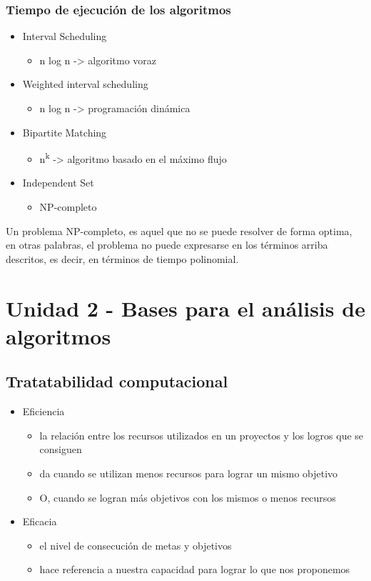 \documentclass[letterpaper]{article}
\begin{document}
\subsubsection{Tiempo de ejecución de los algoritmos}
\label{sec:org1f630ad}
\begin{itemize}
\item Interval Scheduling
\begin{itemize}
\item n log n -> algoritmo voraz
\end{itemize}
\item Weighted interval scheduling
\begin{itemize}
\item n log n -> programación dinámica
\end{itemize}
\item Bipartite Matching
\begin{itemize}
\item n\textsuperscript{k} -> algoritmo basado en el máximo flujo
\end{itemize}
\item Independent Set
\begin{itemize}
\item NP-completo
\end{itemize}
\end{itemize}

Un problema NP-completo, es aquel que no se puede resolver de forma optima, en
otras palabras, el problema no puede expresarse en los términos arriba
descritos, es decir, en términos de tiempo polinomial.
\section{Unidad 2 - Bases para el análisis de algoritmos}
\label{sec:org84d6785}
\subsection{Tratatabilidad computacional}
\label{sec:org8204d59}
\begin{itemize}
\item Eficiencia
\begin{itemize}
\item la relación entre los recursos utilizados en un proyectos y los logros que
se consiguen
\item da cuando se utilizan menos recursos para lograr un mismo objetivo
\item O, cuando se logran más objetivos con los mismos o menos recursos
\end{itemize}
\item Eficacia
\begin{itemize}
\item el nivel de consecución de metas y objetivos
\item hace referencia a nuestra capacidad para lograr lo que nos proponemos
\end{itemize}
\end{itemize}
\end{document}

